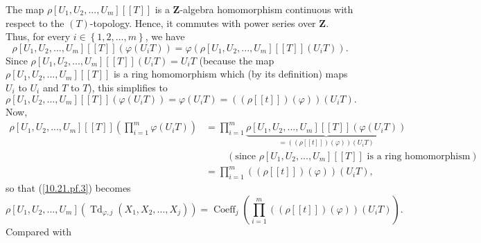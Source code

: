 \documentclass[numbers=enddot,12pt,final,onecolumn,notitlepage]{scrartcl}%
\begin{document}
The map $\rho\left[  U_{1},U_{2},...,U_{m}\right]  \left[  \left[  T\right]
\right]  $ is a $\mathbf{Z}$-algebra homomorphism continuous with respect to
the $\left(  T\right)  $-topology. Hence, it commutes with power series over
$\mathbf{Z}$. Thus, for every $i\in\left\{  1,2,...,m\right\}  $, we have%
\[
\rho\left[  U_{1},U_{2},...,U_{m}\right]  \left[  \left[  T\right]  \right]
\left(  \varphi\left(  U_{i}T\right)  \right)  =\varphi\left(  \rho\left[
U_{1},U_{2},...,U_{m}\right]  \left[  \left[  T\right]  \right]  \left(
U_{i}T\right)  \right)  .
\]
Since $\rho\left[  U_{1},U_{2},...,U_{m}\right]  \left[  \left[  T\right]
\right]  \left(  U_{i}T\right)  =U_{i}T$ (because the map $\rho\left[
U_{1},U_{2},...,U_{m}\right]  \left[  \left[  T\right]  \right]  $ is a ring
homomorphism which (by its definition) maps $U_{i}$ to $U_{i}$ and $T$ to
$T$), this simplifies to%
\[
\rho\left[  U_{1},U_{2},...,U_{m}\right]  \left[  \left[  T\right]  \right]
\left(  \varphi\left(  U_{i}T\right)  \right)  =\varphi\left(  U_{i}T\right)
=\left(  \left(  \rho\left[  \left[  t\right]  \right]  \right)  \left(
\varphi\right)  \right)  \left(  U_{i}T\right)  .
\]
Now,%
\begin{align*}
\rho\left[  U_{1},U_{2},...,U_{m}\right]  \left[  \left[  T\right]  \right]
\left(  \prod\limits_{i=1}^{m}\varphi\left(  U_{i}T\right)  \right)   &
=\prod\limits_{i=1}^{m}\underbrace{\rho\left[  U_{1},U_{2},...,U_{m}\right]
\left[  \left[  T\right]  \right]  \left(  \varphi\left(  U_{i}T\right)
\right)  }_{=\left(  \left(  \rho\left[  \left[  t\right]  \right]  \right)
\left(  \varphi\right)  \right)  \left(  U_{i}T\right)  }\\
&  \ \ \ \ \ \ \ \ \ \ \left(  \text{since }\rho\left[  U_{1},U_{2}%
,...,U_{m}\right]  \left[  \left[  T\right]  \right]  \text{ is a ring
homomorphism}\right) \\
&  =\prod\limits_{i=1}^{m}\left(  \left(  \rho\left[  \left[  t\right]
\right]  \right)  \left(  \varphi\right)  \right)  \left(  U_{i}T\right)  ,
\end{align*}
so that (\ref{10.21.pf.3}) becomes%
\[
\rho\left[  U_{1},U_{2},...,U_{m}\right]  \left(  \operatorname*{Td}%
\nolimits_{\varphi,j}\left(  X_{1},X_{2},...,X_{j}\right)  \right)
=\operatorname*{Coeff}\nolimits_{j}\left(  \prod\limits_{i=1}^{m}\left(
\left(  \rho\left[  \left[  t\right]  \right]  \right)  \left(  \varphi
\right)  \right)  \left(  U_{i}T\right)  \right)  .
\]
Compared with%
\end{document}
